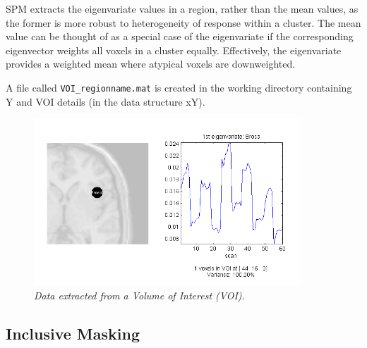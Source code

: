 SPM extracts the eigenvariate values in a region, rather than the mean values, as the former is more robust to
heterogeneity of response within a cluster. The mean value can be thought of as a special case of the eigenvariate if the
corresponding eigenvector weights all voxels in a cluster
equally. Effectively, the
eigenvariate provides a weighted mean where atypical voxels are downweighted.

A file called \verb!VOI_regionname.mat! is created in the working directory containing Y and VOI details (in the data structure xY).

\begin{figure}
\begin{center}
\includegraphics[width=100mm]{pet/voi}
\caption{\em Data extracted from a Volume of Interest (VOI). \label{voi}}
\end{center}
\end{figure}

\subsection{Inclusive Masking}

